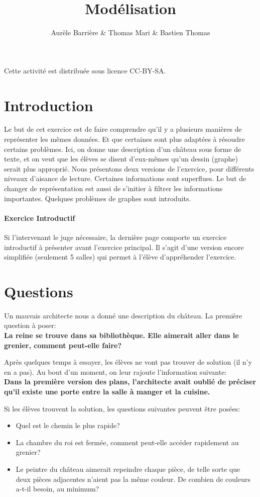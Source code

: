 \documentclass{article}
\title{\vspace{-2cm}Modélisation}
\author{Aurèle Barrière \& Thomas Mari \& Bastien Thomas}
\date{}
\begin{document}
\maketitle

Cette activité est distribuée sous licence CC-BY-SA.

\section{Introduction}
Le but de cet exercice est de faire comprendre qu'il y a plusieurs manières de représenter les mêmes données.
Et que certaines sont plus adaptées à résoudre certains problèmes.
Ici, on donne une description d'un château sous forme de texte, et on veut que les élèves se disent d'eux-mêmes qu'un dessin (graphe) serait plus approprié.
Nous présentons deux versions de l'exercice, pour différents niveaux d'aisance de lecture.
Certaines informations sont superflues. Le but de changer de représentation est aussi de s'initier à filtrer les informations importantes.
Quelques problèmes de graphes sont introduits.

\paragraph{Exercice Introductif}
Si l'intervenant le juge nécessaire, la dernière page comporte un exercice introductif à présenter avant l'exercice principal.
Il s'agit d'une version encore simplifiée (seulement 5 salles) qui permet à l'élève d'appréhender l'exercice.

\section{Questions}
Un mauvais architecte nous a donné une description du château.
La première question à poser:\\
\textbf{La reine se trouve dans sa bibliothèque. Elle aimerait aller dans le grenier, comment peut-elle faire?}

Après quelques temps à essayer, les élèves ne vont pas trouver de solution (il n'y en a pas).
Au bout d'un moment, on leur rajoute l'information suivante:\\
\textbf{Dans la première version des plans, l'architecte avait oublié de préciser qu'il existe une porte entre la salle à manger et la cuisine.}

Si les élèves trouvent la solution, les questions suivantes peuvent être posées:
\begin{itemize}
\item Quel est le chemin le plus rapide?
\item La chambre du roi est fermée, comment peut-elle accéder rapidement au grenier?
\item Le peintre du château aimerait repeindre chaque pièce, de telle sorte que deux pièces adjacentes n'aient pas la même couleur. De combien de couleurs a-t-il besoin, au minimum?
\end{itemize}
\end{document}
